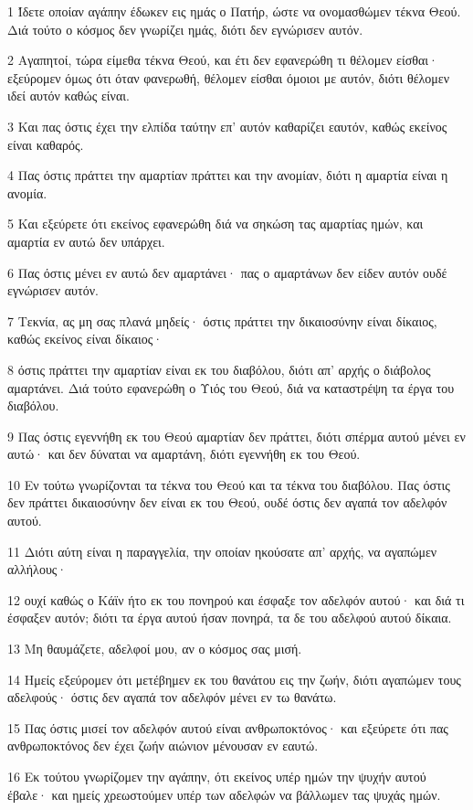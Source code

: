 \par 1 Ίδετε οποίαν αγάπην έδωκεν εις ημάς ο Πατήρ, ώστε να ονομασθώμεν τέκνα Θεού. Διά τούτο ο κόσμος δεν γνωρίζει ημάς, διότι δεν εγνώρισεν αυτόν.
\par 2 Αγαπητοί, τώρα είμεθα τέκνα Θεού, και έτι δεν εφανερώθη τι θέλομεν είσθαι· εξεύρομεν όμως ότι όταν φανερωθή, θέλομεν είσθαι όμοιοι με αυτόν, διότι θέλομεν ιδεί αυτόν καθώς είναι.
\par 3 Και πας όστις έχει την ελπίδα ταύτην επ' αυτόν καθαρίζει εαυτόν, καθώς εκείνος είναι καθαρός.
\par 4 Πας όστις πράττει την αμαρτίαν πράττει και την ανομίαν, διότι η αμαρτία είναι η ανομία.
\par 5 Και εξεύρετε ότι εκείνος εφανερώθη διά να σηκώση τας αμαρτίας ημών, και αμαρτία εν αυτώ δεν υπάρχει.
\par 6 Πας όστις μένει εν αυτώ δεν αμαρτάνει· πας ο αμαρτάνων δεν είδεν αυτόν ουδέ εγνώρισεν αυτόν.
\par 7 Τεκνία, ας μη σας πλανά μηδείς· όστις πράττει την δικαιοσύνην είναι δίκαιος, καθώς εκείνος είναι δίκαιος·
\par 8 όστις πράττει την αμαρτίαν είναι εκ του διαβόλου, διότι απ' αρχής ο διάβολος αμαρτάνει. Διά τούτο εφανερώθη ο Υιός του Θεού, διά να καταστρέψη τα έργα του διαβόλου.
\par 9 Πας όστις εγεννήθη εκ του Θεού αμαρτίαν δεν πράττει, διότι σπέρμα αυτού μένει εν αυτώ· και δεν δύναται να αμαρτάνη, διότι εγεννήθη εκ του Θεού.
\par 10 Εν τούτω γνωρίζονται τα τέκνα του Θεού και τα τέκνα του διαβόλου. Πας όστις δεν πράττει δικαιοσύνην δεν είναι εκ του Θεού, ουδέ όστις δεν αγαπά τον αδελφόν αυτού.
\par 11 Διότι αύτη είναι η παραγγελία, την οποίαν ηκούσατε απ' αρχής, να αγαπώμεν αλλήλους·
\par 12 ουχί καθώς ο Κάϊν ήτο εκ του πονηρού και έσφαξε τον αδελφόν αυτού· και διά τι έσφαξεν αυτόν; διότι τα έργα αυτού ήσαν πονηρά, τα δε του αδελφού αυτού δίκαια.
\par 13 Μη θαυμάζετε, αδελφοί μου, αν ο κόσμος σας μισή.
\par 14 Ημείς εξεύρομεν ότι μετέβημεν εκ του θανάτου εις την ζωήν, διότι αγαπώμεν τους αδελφούς· όστις δεν αγαπά τον αδελφόν μένει εν τω θανάτω.
\par 15 Πας όστις μισεί τον αδελφόν αυτού είναι ανθρωποκτόνος· και εξεύρετε ότι πας ανθρωποκτόνος δεν έχει ζωήν αιώνιον μένουσαν εν εαυτώ.
\par 16 Εκ τούτου γνωρίζομεν την αγάπην, ότι εκείνος υπέρ ημών την ψυχήν αυτού έβαλε· και ημείς χρεωστούμεν υπέρ των αδελφών να βάλλωμεν τας ψυχάς ημών.
